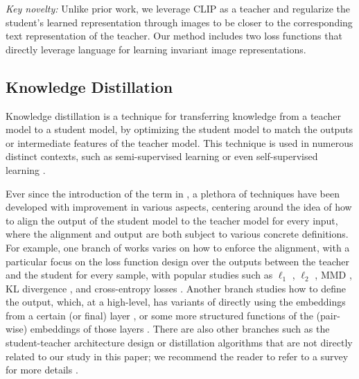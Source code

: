 \documentclass[10pt,twocolumn,letterpaper]{article}
\begin{document}
\emph{Key novelty:} Unlike prior work, we leverage CLIP as a teacher and regularize the student's learned representation through images to be closer to the corresponding text representation of the teacher. Our method includes two loss functions that directly leverage language for learning invariant image representations. 

\subsection{Knowledge Distillation}
Knowledge distillation is a technique for transferring knowledge from a teacher model to a student model, 
by optimizing the student model to match the outputs or intermediate features of the teacher model. 
This technique is used in numerous distinct contexts, such as semi-supervised learning \cite{orbes2019knowledge} or even self-supervised learning \cite{xu2020knowledge}.

Ever since the introduction of the term in 
\cite{DBLP:journals/corr/HintonVD15}, 
a plethora of techniques have been developed \cite{gou2021knowledge}
with improvement in various aspects, 
centering around the idea of 
how to align the output of the student model 
to the teacher model for every input, 
where the alignment and output are both subject to various concrete definitions. 
For example, 
one branch of works varies on how to enforce the alignment, 
with a particular focus on the loss function design 
over the outputs between the teacher and the student for every sample, 
with popular studies such as $\ell_1$ \cite{DBLP:conf/nips/KimPK18}, $\ell_2$ \cite{DBLP:journals/tnn/ChenWXXT21,DBLP:conf/aaai/PassbanWRL21,DBLP:conf/eccv/WangFLWLM20}, 
MMD \cite{DBLP:journals/corr/HuangW17a}, 
KL divergence \cite{DBLP:conf/aaai/ChenWZ18,DBLP:journals/tnn/PassalisTT21,DBLP:conf/cvpr/PassalisTT20}, 
and cross-entropy losses \cite{DBLP:conf/eccv/XuRLG20,DBLP:conf/cvpr/LiuWGTCOK19}.
Another branch studies how to define the output, which, 
at a high-level, 
has variants of directly using the embeddings from a certain (or final) layer \cite{DBLP:journals/corr/abs-2003-04289,DBLP:conf/eccv/GuanZWZYBT20,DBLP:conf/iccv/HeoKYPK019,DBLP:conf/aaai/ShenWSSS19}, 
or some more structured functions of the (pair-wise) embeddings of those layers \cite{DBLP:conf/fgr/LiPZ21,DBLP:conf/ijcai/ZhangP18a,DBLP:conf/cvpr/YimJBK17}.
There are also other branches 
such as the student-teacher architecture design 
or distillation algorithms that are not directly related to our study in this paper; 
we recommend the reader to refer to a survey for more details \cite{gou2021knowledge}. 
\end{document}
